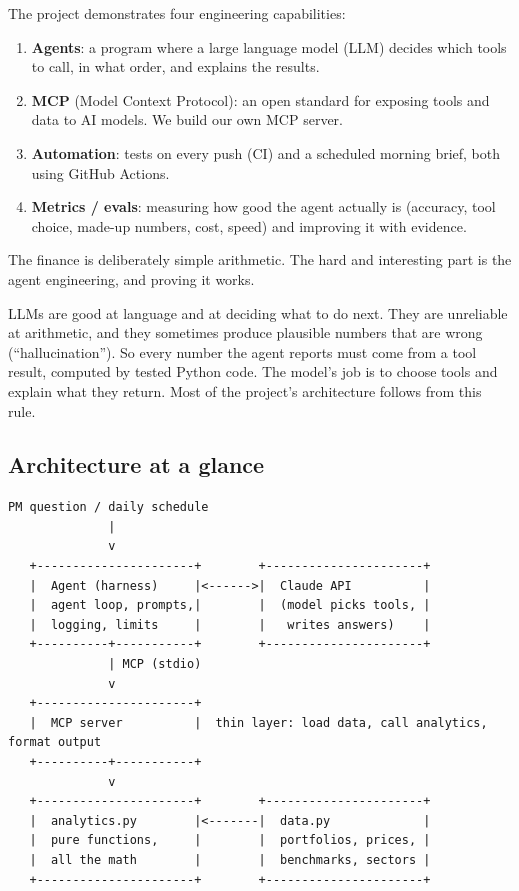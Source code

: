 \documentclass[11pt]{article}
\begin{document}
The project demonstrates four engineering capabilities:

\begin{enumerate}
  \item \textbf{Agents}: a program where a large language model (LLM) decides which tools to
        call, in what order, and explains the results.
  \item \textbf{MCP} (Model Context Protocol): an open standard for exposing tools and data
        to AI models. We build our own MCP server.
  \item \textbf{Automation}: tests on every push (CI) and a scheduled morning brief, both
        using GitHub Actions.
  \item \textbf{Metrics / evals}: measuring how good the agent actually is (accuracy, tool
        choice, made-up numbers, cost, speed) and improving it with evidence.
\end{enumerate}

The finance is deliberately simple arithmetic. The hard and interesting part is the agent
engineering, and proving it works.

\begin{keyidea}
LLMs are good at language and at deciding what to do next. They are unreliable at
arithmetic, and they sometimes produce plausible numbers that are wrong (``hallucination'').
So every number the agent reports must come from a tool result, computed by tested Python
code. The model's job is to choose tools and explain what they return. Most of the project's
architecture follows from this rule.
\end{keyidea}

\subsection{Architecture at a glance}

\begin{lstlisting}[style=plain]
  PM question / daily schedule
              |
              v
   +----------------------+        +----------------------+
   |  Agent (harness)     |<------>|  Claude API          |
   |  agent loop, prompts,|        |  (model picks tools, |
   |  logging, limits     |        |   writes answers)    |
   +----------+-----------+        +----------------------+
              | MCP (stdio)
              v
   +----------------------+
   |  MCP server          |  thin layer: load data, call analytics, format output
   +----------+-----------+
              v
   +----------------------+        +----------------------+
   |  analytics.py        |<-------|  data.py             |
   |  pure functions,     |        |  portfolios, prices, |
   |  all the math        |        |  benchmarks, sectors |
   +----------------------+        +----------------------+
\end{lstlisting}
\end{document}
